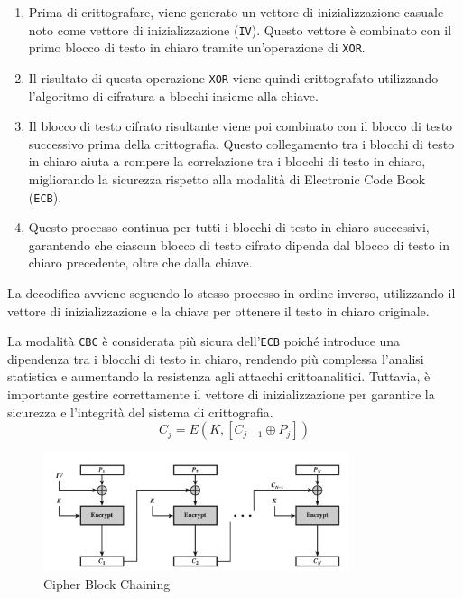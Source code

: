 \begin{enumerate}
    \item Prima di crittografare, viene generato un vettore di inizializzazione
    casuale noto come vettore di inizializzazione (\texttt{IV}). Questo vettore
    è combinato con il primo blocco di testo in chiaro tramite un'operazione di
    \texttt{XOR}.
    
    \item Il risultato di questa operazione \texttt{XOR} viene quindi
    crittografato utilizzando l'algoritmo di cifratura a blocchi insieme
    alla chiave.
    
    \item Il blocco di testo cifrato risultante viene poi combinato con il
    blocco di testo successivo prima della crittografia. Questo collegamento
    tra i blocchi di testo in chiaro aiuta a rompere la correlazione tra i
    blocchi di testo in chiaro, migliorando la sicurezza rispetto alla modalità
    di Electronic Code Book (\texttt{ECB}).
    
    \item Questo processo continua per tutti i blocchi di testo in chiaro
    successivi, garantendo che ciascun blocco di testo cifrato dipenda dal
    blocco di testo in chiaro precedente, oltre che dalla chiave.
\end{enumerate}

La decodifica avviene seguendo lo stesso processo in ordine inverso,
utilizzando il vettore di inizializzazione e la chiave per ottenere il
testo in chiaro originale.

La modalità \texttt{CBC} è considerata più sicura dell'\texttt{ECB} poiché
introduce una
dipendenza tra i blocchi di testo in chiaro, rendendo più complessa l'analisi
statistica e aumentando la resistenza agli attacchi crittoanalitici.
Tuttavia, è importante gestire correttamente il vettore di inizializzazione
per garantire la sicurezza e l'integrità del sistema di crittografia.
\[ C_j = E(K, [C_{j-1} \oplus P_j]) \]
\begin{figure}[H]
    \centering
    \includegraphics[width=0.8\textwidth]{img/CBC.png}
    \caption{Cipher Block Chaining}
\end{figure}
